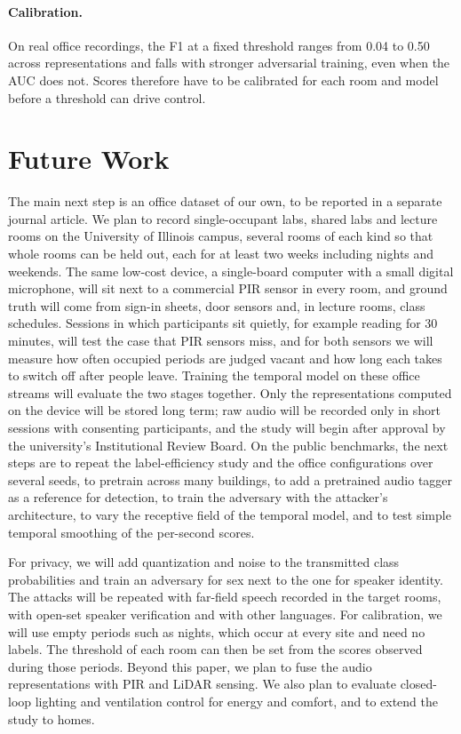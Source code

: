 \documentclass[11pt]{article}
\begin{document}
\paragraph{Calibration.} On real office recordings, the F1 at a fixed threshold ranges from 0.04 to 0.50 across representations and falls with stronger adversarial training, even when the AUC does not. Scores therefore have to be calibrated for each room and model before a threshold can drive control.

\section{Future Work}
\label{sec:future}

The main next step is an office dataset of our own, to be reported in a separate journal article. We plan to record single-occupant labs, shared labs and lecture rooms on the University of Illinois campus, several rooms of each kind so that whole rooms can be held out, each for at least two weeks including nights and weekends. The same low-cost device, a single-board computer with a small digital microphone, will sit next to a commercial PIR sensor in every room, and ground truth will come from sign-in sheets, door sensors and, in lecture rooms, class schedules. Sessions in which participants sit quietly, for example reading for 30 minutes, will test the case that PIR sensors miss, and for both sensors we will measure how often occupied periods are judged vacant and how long each takes to switch off after people leave. Training the temporal model on these office streams will evaluate the two stages together. Only the representations computed on the device will be stored long term; raw audio will be recorded only in short sessions with consenting participants, and the study will begin after approval by the university's Institutional Review Board. On the public benchmarks, the next steps are to repeat the label-efficiency study and the office configurations over several seeds, to pretrain across many buildings, to add a pretrained audio tagger as a reference for detection, to train the adversary with the attacker's architecture, to vary the receptive field of the temporal model, and to test simple temporal smoothing of the per-second scores.

For privacy, we will add quantization and noise to the transmitted class probabilities and train an adversary for sex next to the one for speaker identity. The attacks will be repeated with far-field speech recorded in the target rooms, with open-set speaker verification and with other languages. For calibration, we will use empty periods such as nights, which occur at every site and need no labels. The threshold of each room can then be set from the scores observed during those periods. Beyond this paper, we plan to fuse the audio representations with PIR and LiDAR sensing. We also plan to evaluate closed-loop lighting and ventilation control for energy and comfort, and to extend the study to homes.
\end{document}
